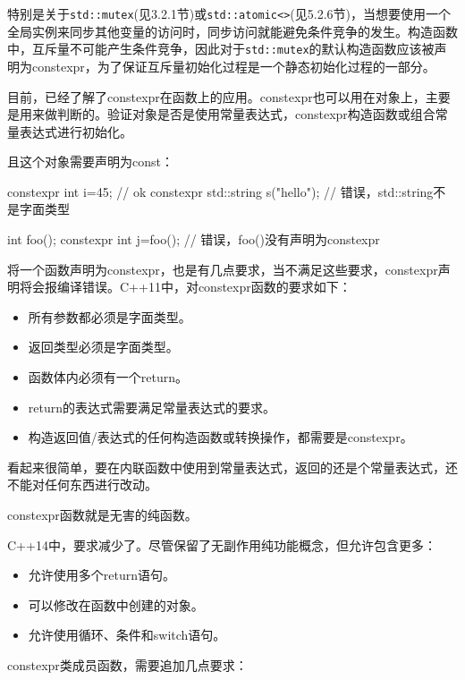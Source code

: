 特别是关于\texttt{std::mutex}(见3.2.1节)或\texttt{std::atomic<>}(见5.2.6节)，当想要使用一个全局实例来同步其他变量的访问时，同步访问就能避免条件竞争的发生。构造函数中，互斥量不可能产生条件竞争，因此对于\texttt{std::mutex}的默认构造函数应该被声明为constexpr，为了保证互斥量初始化过程是一个静态初始化过程的一部分。


目前，已经了解了constexpr在函数上的应用。constexpr也可以用在对象上，主要是用来做判断的。验证对象是否是使用常量表达式，constexpr构造函数或组合常量表达式进行初始化。

且这个对象需要声明为const：

\begin{cpp}
constexpr int i=45;  // ok
constexpr std::string s("hello");  // 错误，std::string不是字面类型

int foo();
constexpr int j=foo();  // 错误，foo()没有声明为constexpr
\end{cpp}


将一个函数声明为constexpr，也是有几点要求，当不满足这些要求，constexpr声明将会报编译错误。C++11中，对constexpr函数的要求如下：

\begin{itemize}
\item 所有参数都必须是字面类型。
\item 返回类型必须是字面类型。
\item 函数体内必须有一个return。
\item return的表达式需要满足常量表达式的要求。
\item 构造返回值/表达式的任何构造函数或转换操作，都需要是constexpr。
\end{itemize}

看起来很简单，要在内联函数中使用到常量表达式，返回的还是个常量表达式，还不能对任何东西进行改动。

constexpr函数就是无害的纯函数。

C++14中，要求减少了。尽管保留了无副作用纯功能概念，但允许包含更多：

\begin{itemize}
    \item 允许使用多个return语句。
    \item 可以修改在函数中创建的对象。
    \item 允许使用循环、条件和switch语句。
\end{itemize}

constexpr类成员函数，需要追加几点要求：

